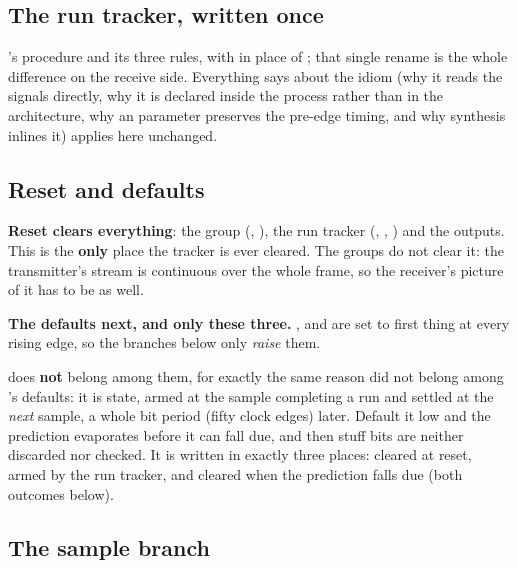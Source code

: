 \subsection{The run tracker, written once}
\label{c15:sub:tracker}

's procedure  and its three rules, with  in place
of ; that single rename is the whole difference on the receive side. Everything
 says about the idiom (why it reads the signals directly, why it is declared
inside the process rather than in the architecture, why an  parameter preserves the pre-edge
timing, and why synthesis inlines it) applies here unchanged.

\subsection{Reset and defaults}
\label{c15:sub:defaults}

\textbf{Reset clears everything}: the group (, ), the run tracker
(, , ) and the outputs. This is the
\textbf{only} place the tracker is ever cleared. The groups do not clear it: the transmitter's stream
is continuous over the whole frame, so the receiver's picture of it has to be as well.

\textbf{The defaults next, and only these three.} ,  and
 are set to  first thing at every rising edge, so the branches below
only \emph{raise} them.

\begin{warning}
 does \textbf{not} belong among them, for exactly the same reason
 did not belong among 's defaults: it is state, armed at the
sample completing a run and settled at the \emph{next} sample, a whole bit period (fifty clock edges)
later. Default it low and the prediction evaporates before it can fall due, and then stuff bits are
neither discarded nor checked. It is written in exactly three places: cleared at reset, armed by the
run tracker, and cleared when the prediction falls due (both outcomes below).
\end{warning}

\subsection{The sample branch}
\label{c15:sub:sample}

